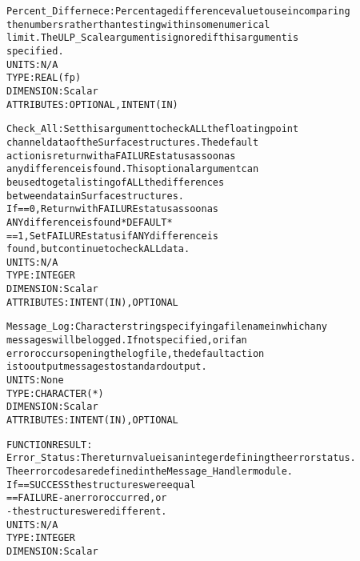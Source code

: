\begin{alltt}
        Percent_Differnece: Percentage difference value to use in comparing
                            the numbers rather than testing within some numerical
                            limit. The ULP_Scale argument is ignored if this argument is
                            specified.
                            UNITS:      N/A
                            TYPE:       REAL(fp)
                            DIMENSION:  Scalar
                            ATTRIBUTES: OPTIONAL, INTENT(IN)
 
        Check_All:          Set this argument to check ALL the floating point
                            channel data of the Surface structures. The default
                            action is return with a FAILURE status as soon as
                            any difference is found. This optional argument can
                            be used to get a listing of ALL the differences
                            between data in Surface structures.
                            If == 0, Return with FAILURE status as soon as
                                     ANY difference is found  *DEFAULT*
                               == 1, Set FAILURE status if ANY difference is
                                     found, but continue to check ALL data.
                            UNITS:      N/A
                            TYPE:       INTEGER
                            DIMENSION:  Scalar
                            ATTRIBUTES: INTENT(IN), OPTIONAL
 
        Message_Log:        Character string specifying a filename in which any
                            messages will be logged. If not specified, or if an
                            error occurs opening the log file, the default action
                            is to output messages to standard output.
                            UNITS:      None
                            TYPE:       CHARACTER(*)
                            DIMENSION:  Scalar
                            ATTRIBUTES: INTENT(IN), OPTIONAL
 
  FUNCTION RESULT:
        Error_Status:       The return value is an integer defining the error status.
                            The error codes are defined in the Message_Handler module.
                            If == SUCCESS the structures were equal
                               == FAILURE - an error occurred, or
                                          - the structures were different.
                            UNITS:      N/A
                            TYPE:       INTEGER
                            DIMENSION:  Scalar
 
  \end{alltt}
